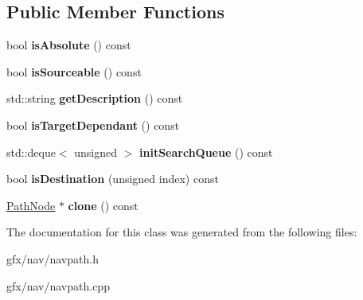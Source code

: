 \subsection*{Public Member Functions}
\begin{DoxyCompactItemize}
\item 
bool {\bfseries is\+Absolute} () const \hypertarget{classTargetPathNode_acd8f97c4ff2107184d2a1e8721d70904}{}\label{classTargetPathNode_acd8f97c4ff2107184d2a1e8721d70904}

\item 
bool {\bfseries is\+Sourceable} () const \hypertarget{classTargetPathNode_a6fe9c3734c79b9d98119ab30b482441d}{}\label{classTargetPathNode_a6fe9c3734c79b9d98119ab30b482441d}

\item 
std\+::string {\bfseries get\+Description} () const \hypertarget{classTargetPathNode_a6c3d07df42df8ebcac4239bba40a2940}{}\label{classTargetPathNode_a6c3d07df42df8ebcac4239bba40a2940}

\item 
bool {\bfseries is\+Target\+Dependant} () const \hypertarget{classTargetPathNode_af4a3fb6bf15b1daa9c5d87feb484f973}{}\label{classTargetPathNode_af4a3fb6bf15b1daa9c5d87feb484f973}

\item 
std\+::deque$<$ unsigned $>$ {\bfseries init\+Search\+Queue} () const \hypertarget{classTargetPathNode_a36a81c2be93e555ae1de0cd34e3b5a82}{}\label{classTargetPathNode_a36a81c2be93e555ae1de0cd34e3b5a82}

\item 
bool {\bfseries is\+Destination} (unsigned index) const \hypertarget{classTargetPathNode_a687c3b669703919f692a1b69238b064b}{}\label{classTargetPathNode_a687c3b669703919f692a1b69238b064b}

\item 
\hyperlink{classPathNode}{Path\+Node} $\ast$ {\bfseries clone} () const \hypertarget{classTargetPathNode_ad8d16001b7531d5555769afda35564e9}{}\label{classTargetPathNode_ad8d16001b7531d5555769afda35564e9}

\end{DoxyCompactItemize}


The documentation for this class was generated from the following files\+:\begin{DoxyCompactItemize}
\item 
gfx/nav/navpath.\+h\item 
gfx/nav/navpath.\+cpp\end{DoxyCompactItemize}
